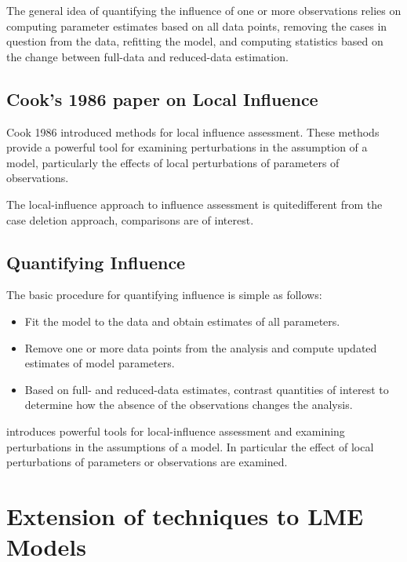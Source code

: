 \documentclass[00-MASTER.tex]{subfiles}
\begin{document}
	The general idea of quantifying the influence of one or more observations relies on computing parameter estimates based on all data points, removing the cases in question from the data, refitting the model, and computing statistics based on the change between full-data and reduced-data estimation. 
	
	
	\subsection{Cook's 1986 paper on Local Influence}%
	Cook 1986 introduced methods for local influence assessment. These methods provide a powerful tool for examining perturbations in the assumption of a model, particularly the effects of local perturbations of parameters of observations.
	
	The local-influence approach to influence assessment is quitedifferent from the case deletion approach, comparisons are of
	interest.
	
	

\subsection{Quantifying Influence}  %

The basic procedure for quantifying influence is simple as follows:

\begin{itemize}
	\item Fit the model to the data and obtain estimates of all parameters.
	\item Remove one or more data points from the analysis and compute updated estimates of model parameters.
	\item Based on full- and reduced-data estimates, contrast quantities of interest to determine how the absence of the observations changes the analysis.
\end{itemize}

\citet{cook86} introduces powerful tools for local-influence assessment and examining perturbations in the assumptions of a model. In particular the effect of local perturbations of parameters or observations are examined.


\newpage
\section{Extension of techniques to LME Models} %
\end{document}
